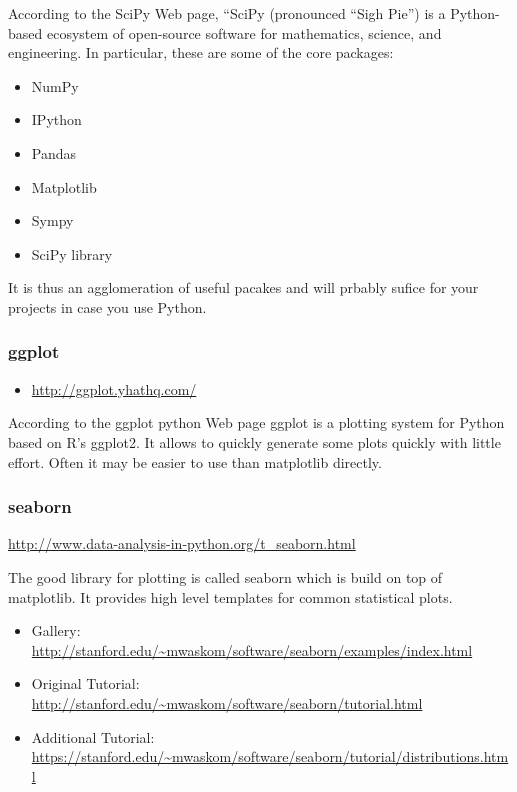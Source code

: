 According to the SciPy Web page, ``SciPy (pronounced “Sigh Pie”) is a
Python-based ecosystem of open-source software for mathematics,
science, and engineering. In particular, these are some of the core
packages:
\begin{itemize}
\item {} 
NumPy

\item {} 
IPython

\item {} 
Pandas

\item {} 
Matplotlib

\item {} 
Sympy

\item {} 
SciPy library

\end{itemize}

It is thus an agglomeration of useful pacakes and will prbably sufice
for your projects in case you use Python.


\subsubsection{ggplot}
\label{\detokenize{lesson/prg/python_big_data:ggplot}}\begin{itemize}
\item {} 
\url{http://ggplot.yhathq.com/}

\end{itemize}

According to the ggplot python Web page ggplot is a plotting system
for Python based on R's ggplot2. It allows to quickly generate some
plots quickly with little effort. Often it may be easier to use than
matplotlib directly.


\subsubsection{seaborn}
\label{\detokenize{lesson/prg/python_big_data:seaborn}}
\url{http://www.data-analysis-in-python.org/t\_seaborn.html}

The good library for plotting is called seaborn which is build on top
of matplotlib. It provides high level templates for common
statistical plots.
\begin{itemize}
\item {} 
Gallery: \url{http://stanford.edu/~mwaskom/software/seaborn/examples/index.html}

\item {} 
Original Tutorial: \url{http://stanford.edu/~mwaskom/software/seaborn/tutorial.html}

\item {} 
Additional Tutorial: \url{https://stanford.edu/~mwaskom/software/seaborn/tutorial/distributions.html}

\end{itemize}


